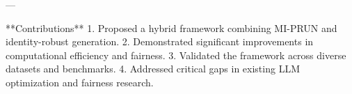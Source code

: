 ---

**Contributions**  
1. Proposed a hybrid framework combining MI-PRUN and identity-robust generation.  
2. Demonstrated significant improvements in computational efficiency and fairness.  
3. Validated the framework across diverse datasets and benchmarks.  
4. Addressed critical gaps in existing LLM optimization and fairness research.  

